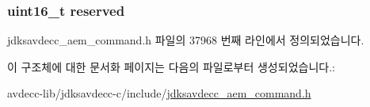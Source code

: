 \subsubsection[{\texorpdfstring{reserved}{reserved}}]{\setlength{\rightskip}{0pt plus 5cm}uint16\+\_\+t reserved}\hypertarget{structjdksavdecc__aem__command__auth__delete__key__from__chain__response_a5a6ed8c04a3db86066924b1a1bf4dad3}{}\label{structjdksavdecc__aem__command__auth__delete__key__from__chain__response_a5a6ed8c04a3db86066924b1a1bf4dad3}


jdksavdecc\+\_\+aem\+\_\+command.\+h 파일의 37968 번째 라인에서 정의되었습니다.



이 구조체에 대한 문서화 페이지는 다음의 파일로부터 생성되었습니다.\+:\begin{DoxyCompactItemize}
\item 
avdecc-\/lib/jdksavdecc-\/c/include/\hyperlink{jdksavdecc__aem__command_8h}{jdksavdecc\+\_\+aem\+\_\+command.\+h}\end{DoxyCompactItemize}

